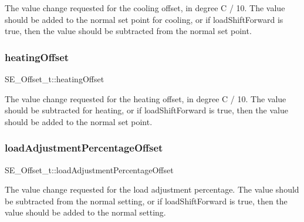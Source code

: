 The value change requested for the cooling offset, in degree C / 10. The value should be added to the normal set point for cooling, or if load\+Shift\+Forward is true, then the value should be subtracted from the normal set point. \mbox{\label{group__Offset_ga40bf7a0665bcb020988d5aaa8e0f23a7}} 
\subsubsection{\texorpdfstring{heating\+Offset}{heatingOffset}}
{\footnotesize\ttfamily S\+E\+\_\+\+Offset\+\_\+t\+::heating\+Offset}

The value change requested for the heating offset, in degree C / 10. The value should be subtracted for heating, or if load\+Shift\+Forward is true, then the value should be added to the normal set point. \mbox{\label{group__Offset_ga1f508f716b28a7d822a64597dd800c32}} 
\subsubsection{\texorpdfstring{load\+Adjustment\+Percentage\+Offset}{loadAdjustmentPercentageOffset}}
{\footnotesize\ttfamily S\+E\+\_\+\+Offset\+\_\+t\+::load\+Adjustment\+Percentage\+Offset}

The value change requested for the load adjustment percentage. The value should be subtracted from the normal setting, or if load\+Shift\+Forward is true, then the value should be added to the normal setting. 